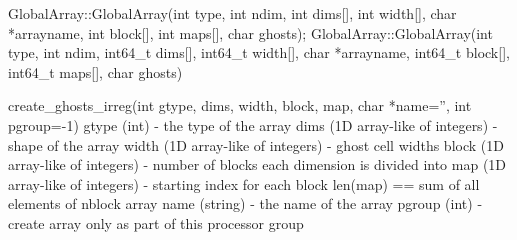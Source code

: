 \documentclass[12pt]{article}
\begin{document}
\begin{cxxapi}
\begin{cxxcode}
GlobalArray::GlobalArray(int type, int ndim, int dims[], int width[], 
                         char *arrayname,
                         int block[], int maps[], char ghosts);
GlobalArray::GlobalArray(int type, int ndim, int64_t dims[], 
                         int64_t width[], char *arrayname,
                         int64_t block[], int64_t maps[], char ghosts)
\end{cxxcode}
\begin{funcargs}
\end{funcargs}
\end{cxxapi}

\begin{pyapi}
\begin{pycode}
create_ghosts_irreg(int gtype, dims, width, block, map, char *name='', 
int pgroup=-1)
   gtype (int)                       - the type of the array
   dims (1D array-like of integers)  - shape of the array
   width (1D array-like of integers) - ghost cell widths
   block (1D array-like of integers) - number of blocks each dimension is 
                                       divided into
   map (1D array-like of integers)   - starting index for each block 
                                       len(map) == sum of all elements of 
                                       nblock array
   name (string)                     - the name of the array
   pgroup (int)                      - create array only as part of this 
                                       processor group
\end{pycode}
\end{pyapi}
\dcoll
\end{document}
